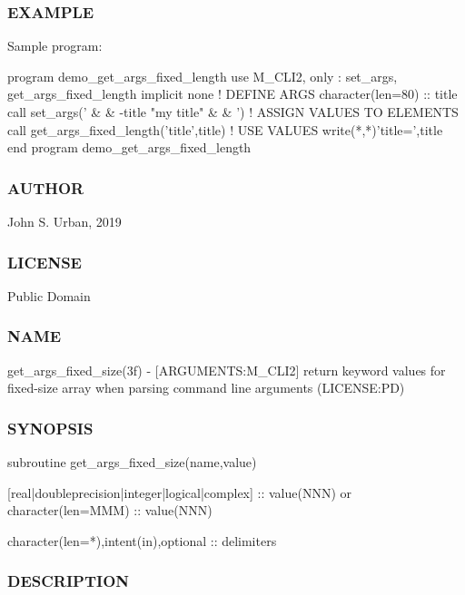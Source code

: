 \subsubsection*{E\+X\+A\+M\+P\+LE}

Sample program\+: \begin{DoxyVerb}program demo_get_args_fixed_length
use M_CLI2,  only : set_args, get_args_fixed_length
implicit none
! DEFINE ARGS
character(len=80)   :: title
call set_args(' &
   & -title "my title" &
   & ')
! ASSIGN VALUES TO ELEMENTS
   call get_args_fixed_length('title',title)
! USE VALUES
   write(*,*)'title=',title
end program demo_get_args_fixed_length
\end{DoxyVerb}


\subsubsection*{A\+U\+T\+H\+OR}

John S. Urban, 2019 \subsubsection*{L\+I\+C\+E\+N\+SE}

Public Domain \subsubsection*{N\+A\+ME}

get\+\_\+args\+\_\+fixed\+\_\+size(3f) -\/ \mbox{[}A\+R\+G\+U\+M\+E\+N\+TS\+:M\+\_\+\+C\+L\+I2\mbox{]} return keyword values for fixed-\/size array when parsing command line arguments (L\+I\+C\+E\+N\+SE\+:PD)

\subsubsection*{S\+Y\+N\+O\+P\+S\+IS}

\begin{DoxyVerb}subroutine get_args_fixed_size(name,value)

 [real|doubleprecision|integer|logical|complex] :: value(NNN)
    or
 character(len=MMM) :: value(NNN)

 character(len=*),intent(in),optional :: delimiters
\end{DoxyVerb}


\subsubsection*{D\+E\+S\+C\+R\+I\+P\+T\+I\+ON}

